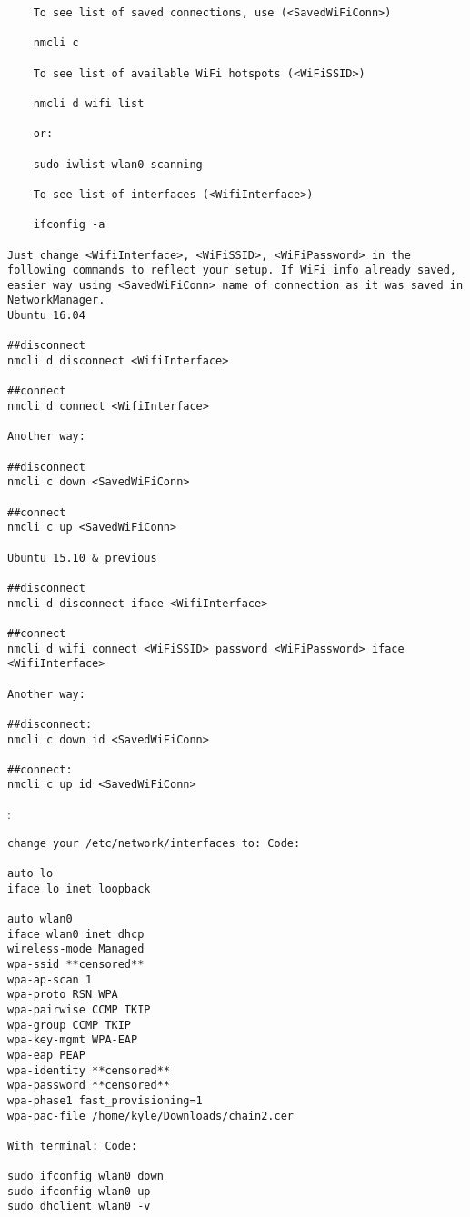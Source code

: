 \begin{itemize}
\begin{verbatim}
    To see list of saved connections, use (<SavedWiFiConn>)

    nmcli c

    To see list of available WiFi hotspots (<WiFiSSID>)

    nmcli d wifi list

    or:

    sudo iwlist wlan0 scanning

    To see list of interfaces (<WifiInterface>)

    ifconfig -a

Just change <WifiInterface>, <WiFiSSID>, <WiFiPassword> in the following commands to reflect your setup. If WiFi info already saved, easier way using <SavedWiFiConn> name of connection as it was saved in NetworkManager.
Ubuntu 16.04

##disconnect
nmcli d disconnect <WifiInterface>

##connect
nmcli d connect <WifiInterface>

Another way:

##disconnect
nmcli c down <SavedWiFiConn>

##connect
nmcli c up <SavedWiFiConn>

Ubuntu 15.10 & previous

##disconnect
nmcli d disconnect iface <WifiInterface>

##connect
nmcli d wifi connect <WiFiSSID> password <WiFiPassword> iface <WifiInterface>

Another way:

##disconnect:
nmcli c down id <SavedWiFiConn>

##connect:
nmcli c up id <SavedWiFiConn>
\end{verbatim}

:
\begin{verbatim}
change your /etc/network/interfaces to: Code:

auto lo
iface lo inet loopback

auto wlan0
iface wlan0 inet dhcp
wireless-mode Managed
wpa-ssid **censored**
wpa-ap-scan 1
wpa-proto RSN WPA
wpa-pairwise CCMP TKIP
wpa-group CCMP TKIP
wpa-key-mgmt WPA-EAP
wpa-eap PEAP
wpa-identity **censored**
wpa-password **censored**
wpa-phase1 fast_provisioning=1
wpa-pac-file /home/kyle/Downloads/chain2.cer

With terminal: Code:

sudo ifconfig wlan0 down
sudo ifconfig wlan0 up
sudo dhclient wlan0 -v
\end{verbatim}
\end{itemize}


